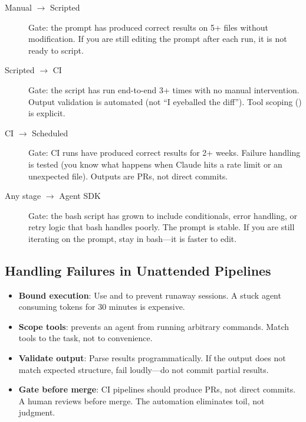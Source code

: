 \begin{description}
  \item[Manual $\rightarrow$ Scripted] Gate: the prompt has produced
    correct results on 5+ files without modification. If you are still
    editing the prompt after each run, it is not ready to script.

  \item[Scripted $\rightarrow$ CI] Gate: the script has run
    end-to-end 3+ times with no manual intervention. Output validation
    is automated (not ``I eyeballed the diff''). Tool scoping
    () is explicit.

  \item[CI $\rightarrow$ Scheduled] Gate: CI runs have produced
    correct results for 2+ weeks. Failure handling is tested
    (you know what happens when Claude hits a rate limit or an
    unexpected file). Outputs are PRs, not direct commits.

  \item[Any stage $\rightarrow$ Agent SDK] Gate: the bash script
    has grown to include conditionals, error handling, or retry logic
    that bash handles poorly. The prompt is stable. If you are still
    iterating on the prompt, stay in bash---it is faster to edit.
\end{description}


\subsection*{Handling Failures in Unattended Pipelines}


\begin{itemize}
  \item \textbf{Bound execution}: Use  and
     to prevent runaway sessions.
    A stuck agent consuming tokens for 30 minutes is expensive.
  \item \textbf{Scope tools}:  prevents
    an agent from running arbitrary commands. Match tools to
    the task, not to convenience.
  \item \textbf{Validate output}: Parse 
    results programmatically. If the output does not match expected
    structure, fail loudly---do not commit partial results.
  \item \textbf{Gate before merge}: CI pipelines should produce PRs,
    not direct commits. A human reviews before merge.
    The automation eliminates toil, not judgment.
\end{itemize}


